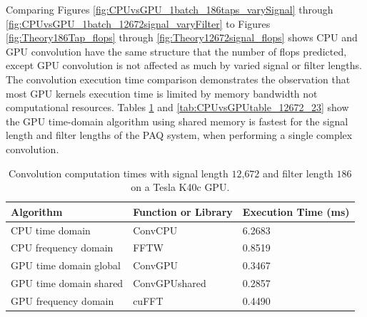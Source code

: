 Comparing Figures \ref{fig:CPUvsGPU_1batch_186taps_varySignal} through \ref{fig:CPUvsGPU_1batch_12672signal_varyFilter}
to Figures \ref{fig:Theory186Tap_flops} through
\ref{fig:Theory12672signal_flops} 
shows
CPU and GPU convolution have the same structure that the number of flops predicted, except GPU convolution is not affected as much by varied signal or filter lengths.
The convolution execution time comparison demonstrates the observation that most GPU kernels execution time is limited by memory bandwidth not computational resources.
Tables \ref{tab:CPUvsGPUtable_12672_186} and \ref{tab:CPUvsGPUtable_12672_23} show the GPU time-domain algorithm using shared memory is fastest for the signal length and filter lengths of the PAQ system, when performing a single complex convolution.
\begin{table}
\captionsetup{width=6in}
\caption{Convolution computation times with signal length $12$,$672$ and filter length $186$ on a Tesla K40c GPU.}
\begin{center}
\begin{tabular}{lll}
	\toprule
	Algorithm 				& Function or Library		& Execution Time (ms) \\ \midrule
	CPU time domain 		& ConvCPU 					& 6.2683		\\
	CPU frequency domain 	& FFTW 						& 0.8519		\\
	GPU time domain global 	& ConvGPU 					& 0.3467		\\
	GPU time domain shared 	& ConvGPUshared 			& 0.2857		\\
	GPU frequency domain 	& cuFFT						& 0.4490		\\ 
	\bottomrule
\end{tabular}
\end{center}
\label{tab:CPUvsGPUtable_12672_186}
\end{table}
